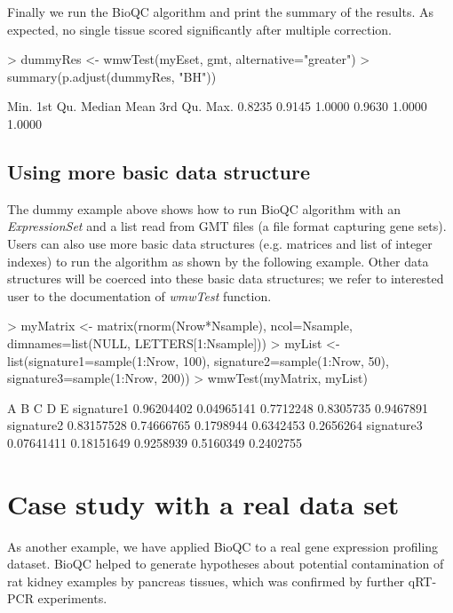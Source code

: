 \documentclass[11pt]{article}
\begin{document}
Finally we run the BioQC algorithm and print the summary of the results. As expected, no single tissue scored significantly after multiple correction.
\begin{Schunk}
\begin{Sinput}
> dummyRes <- wmwTest(myEset, gmt, alternative="greater")
> summary(p.adjust(dummyRes, "BH"))
\end{Sinput}
\begin{Soutput}
   Min. 1st Qu.  Median    Mean 3rd Qu.    Max. 
 0.8235  0.9145  1.0000  0.9630  1.0000  1.0000 
\end{Soutput}
\end{Schunk}

\subsection{Using more basic data structure}
The dummy example above shows how to run BioQC algorithm with an \textit{ExpressionSet} and a list read from GMT files (a file format capturing gene sets). Users can also use more basic data structures (e.g. matrices and list of integer indexes) to run the algorithm as shown by the following example. Other data structures will be coerced into these basic data structures; we refer to interested user to the documentation of \textit{wmwTest} function.

\begin{Schunk}
\begin{Sinput}
> myMatrix <- matrix(rnorm(Nrow*Nsample), ncol=Nsample, dimnames=list(NULL, LETTERS[1:Nsample]))
> myList <- list(signature1=sample(1:Nrow, 100), signature2=sample(1:Nrow, 50), signature3=sample(1:Nrow, 200))
> wmwTest(myMatrix, myList)
\end{Sinput}
\begin{Soutput}
                    A          B         C         D         E
signature1 0.96204402 0.04965141 0.7712248 0.8305735 0.9467891
signature2 0.83157528 0.74666765 0.1798944 0.6342453 0.2656264
signature3 0.07641411 0.18151649 0.9258939 0.5160349 0.2402755
\end{Soutput}
\end{Schunk}

\section{Case study with a real data set}
As another example, we have applied BioQC to a real gene expression profiling dataset. BioQC helped to generate hypotheses about potential contamination of rat kidney examples by pancreas tissues, which was confirmed by further qRT-PCR experiments. 
\end{document}
